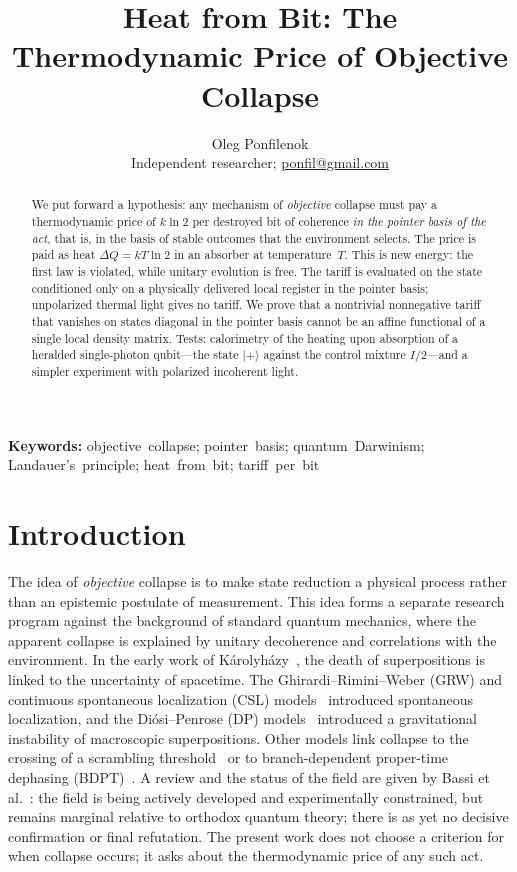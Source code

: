 \documentclass[11pt,a4paper]{article}
\title{\textbf{Heat from Bit: The Thermodynamic Price of Objective Collapse}}
\author{%
  Oleg Ponfilenok\\[0.35em]%
  {\normalsize Independent researcher; \href{mailto:ponfil@gmail.com}{ponfil@gmail.com}}%
}
\date{}
\begin{document}
\maketitle

\begin{abstract}
We put forward a hypothesis: any mechanism of \emph{objective} collapse must pay a thermodynamic price of $k\ln 2$ per destroyed bit of coherence \emph{in the pointer basis of the act}, that is, in the basis of stable outcomes that the environment selects. The price is paid as heat $\Delta Q = kT\ln 2$ in an absorber at temperature~$T$. This is new energy: the first law is violated, while unitary evolution is free. The tariff is evaluated on the state conditioned only on a physically delivered local register in the pointer basis; unpolarized thermal light gives no tariff. We prove that a nontrivial nonnegative tariff that vanishes on states diagonal in the pointer basis cannot be an affine functional of a single local density matrix. Tests: calorimetry of the heating upon absorption of a heralded single-photon qubit---the state $|{+}\rangle$ against the control mixture $I/2$---and a simpler experiment with polarized incoherent light.
\end{abstract}

\noindent\textbf{Keywords:} objective~collapse; pointer~basis; quantum~Darwinism; Landauer's~principle; heat~from~bit; tariff~per~bit

\section{Introduction}\label{sec:intro}

The idea of \emph{objective} collapse is to make state reduction a physical process rather than an epistemic postulate of measurement. This idea forms a separate research program against the background of standard quantum mechanics, where the apparent collapse is explained by unitary decoherence and correlations with the environment. In the early work of Károlyházy~\cite{karolyhazy1966}, the death of superpositions is linked to the uncertainty of spacetime. The Ghirardi--Rimini--Weber (GRW) and continuous spontaneous localization (CSL) models~\cite{grw1986,pearle1989} introduced spontaneous localization, and the Diósi--Penrose (DP) models~\cite{diosi1989,penrose1996} introduced a gravitational instability of macroscopic superpositions. Other models link collapse to the crossing of a scrambling threshold~\cite{ponfilenok2026threshold} or to branch-dependent proper-time dephasing (BDPT)~\cite{ponfilenok2026branch}. A review and the status of the field are given by Bassi et al.~\cite{bassi2013}: the field is being actively developed and experimentally constrained, but remains marginal relative to orthodox quantum theory; there is as yet no decisive confirmation or final refutation. The present work does not choose a criterion for when collapse occurs; it asks about the thermodynamic price of any such act.
\end{document}
